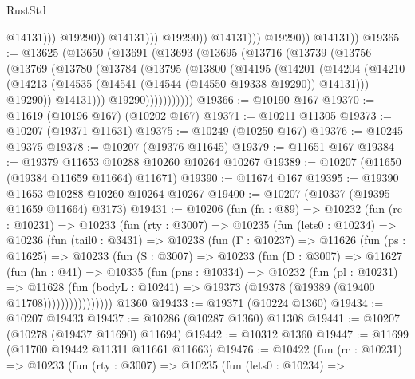 \begin{lexlean}{RustStd}
\begin{coremodule}
                                      @14131)))
                                @19290))
                            @14131)))
                      @19290))
                  @14131)))
            @19290))
        @14131))
@19365 := @13625
    (@13650
      (@13691
        (@13693
          (@13695
            (@13716
              (@13739
                (@13756
                  (@13769
                    (@13780
                      (@13784
                        (@13795
                          (@13800
                            (@14195
                              (@14201
                                (@14204
                                  (@14210
                                    (@14213
                                      (@14535 (@14541 (@14544 (@14550 @19338 @19290)) @14131)))
                                    @19290))
                                @14131)))
                          @19290)))))))))))
@19366 := @10190 @167
@19370 := @11619 (@10196 @167) (@10202 @167)
@19371 := @10211 @11305
@19373 := @10207 (@19371 @11631)
@19375 := @10249 (@10250 @167)
@19376 := @10245 @19375
@19378 := @10207 (@19376 @11645)
@19379 := @11651 @167
@19384 := @19379 @11653 @10288 @10260 @10264 @10267
@19389 := @10207 (@11650 (@19384 @11659 @11664) @11671)
@19390 := @11674 @167
@19395 := @19390 @11653 @10288 @10260 @10264 @10267
@19400 := @10207 (@10337 (@19395 @11659 @11664) @3173)
@19431 := @10206
    (fun (fn : @89) =>
    @10232
      (fun (rc : @10231) =>
      @10233
        (fun (rty : @3007) =>
        @10235
          (fun (lets0 : @10234) =>
          @10236
            (fun (tail0 : @3431) =>
            @10238
              (fun (Γ : @10237) =>
              @11626
                (fun (ps : @11625) =>
                @10233
                  (fun (S : @3007) =>
                  @10233
                    (fun (D : @3007) =>
                    @11627
                      (fun (hn : @41) =>
                      @10335
                        (fun (pns : @10334) =>
                        @10232
                          (fun (pl : @10231) =>
                          @11628
                            (fun (bodyL : @10241) =>
                            @19373 (@19378 (@19389 (@19400 @11708))))))))))))))))
    @1360
@19433 := @19371 (@10224 @1360)
@19434 := @10207 @19433
@19437 := @10286 (@10287 @1360) @11308
@19441 := @10207 (@10278 (@19437 @11690) @11694)
@19442 := @10312 @1360
@19447 := @11699 (@11700 @19442 @11311 @11661 @11663)
@19476 := @10422
    (fun (rc : @10231) =>
    @10233
      (fun (rty : @3007) =>
      @10235
        (fun (lets0 : @10234) =>

\end{coremodule}
\end{lexlean}
